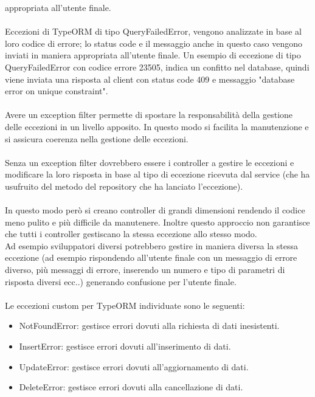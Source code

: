 appropriata all'utente finale.
\\\\
Eccezioni di TypeORM di tipo QueryFailedError, vengono analizzate in base al loro codice di errore; 
lo status code e il messaggio anche in questo caso vengono inviati in maniera appropriata all'utente finale.
Un esempio di eccezione di tipo QueryFailedError con codice errore 23505, indica un confitto nel database, quindi
viene inviata una risposta al client con status code 409 e messaggio "database error on unique constraint".
\\\\
Avere un exception filter permette di spostare la responsabilità della gestione delle eccezioni in un livello
apposito. In questo modo si facilita la manutenzione e si assicura coerenza nella gestione delle eccezioni.
\\\\
Senza un exception filter dovrebbero essere i controller a gestire le eccezioni e modificare la loro risposta
in base al tipo di eccezione ricevuta dal service (che ha usufruito del metodo del repository che ha lanciato
l'eccezione).
\\\\
In questo modo però si creano controller di grandi dimensioni rendendo il codice meno pulito e più difficile
da manutenere. Inoltre questo approccio non garantisce che tutti i controller gestiscano la stessa eccezione
allo stesso modo. 
\\
Ad esempio sviluppatori diversi potrebbero gestire in maniera diversa la stessa eccezione (ad esempio rispondendo
all'utente finale con un messaggio di errore diverso,
più messaggi di errore, inserendo un numero e tipo di parametri di risposta diversi ecc..)
generando confusione per l'utente finale.
\\\\
Le eccezioni custom per TypeORM individuate sono le seguenti:
\begin{itemize}
    \item NotFoundError: gestisce errori dovuti alla richiesta di dati inesistenti.
    \item InsertError: gestisce errori dovuti all'inserimento di dati.
    \item UpdateError: gestisce errori dovuti all'aggiornamento di dati.
    \item DeleteError: gestisce errori dovuti alla cancellazione di dati.
\end{itemize}
\leavevmode\newline

